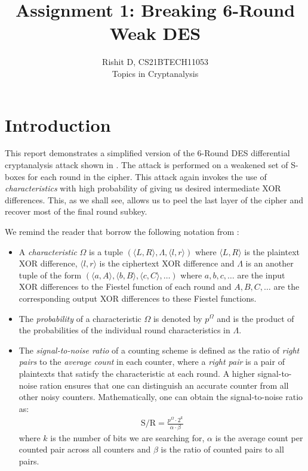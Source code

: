 \documentclass[12pt]{article}
\begin{document}
 
 
\title{Assignment 1: Breaking 6-Round Weak DES}
\author{Rishit D, CS21BTECH11053\\ %
Topics in Cryptanalysis} %


\maketitle

\section{Introduction}
This report demonstrates a simplified version of the 6-Round DES differential cryptanalysis attack shown in \cite{bsmv}. The attack is performed on a weakened set of S-boxes for each round in the cipher. This attack again invokes the use of \emph{characteristics} with high probability of giving us desired intermediate XOR differences. This, as we shall see, allows us to peel the last layer of the cipher and recover most of the final round subkey.

We remind the reader that borrow the following notation from \cite{bsmv}:
\begin{itemize}
  \item A \emph{characteristic} $\Omega$ is a tuple $(\langle L,R \rangle, \Lambda, \langle l,r \rangle)$ where $\langle L,R \rangle$ is the plaintext XOR difference, $\langle l,r \rangle$ is the ciphertext XOR difference and $\Lambda$ is an another tuple of the form $(\langle a,A \rangle, \langle b,B \rangle, \langle c,C \rangle, \dots)$ where $a,b,c,\dots$ are the input XOR differences to the Fiestel function of each round and $A,B,C,\dots$ are the corresponding output XOR differences to these Fiestel functions.

  \item The \emph{probability} of a characteristic $\Omega$ is denoted by $p^{\Omega}$ and is the product of the probabilities of the individual round characteristics in $\Lambda$.

  \item The \emph{signal-to-noise ratio} of a counting scheme is defined as the ratio of \emph{right pairs} to the \emph{average count} in each counter, where a \emph{right pair} is a pair of plaintexts that satisfy the characteristic at each round. A higher signal-to-noise ration ensures that one can distinguish an accurate counter from all other noisy counters. Mathematically, one can obtain the signal-to-noise ratio as:
    \begin{align*}
      \text{S/R} = \frac{p^{\Omega} \cdot 2^k}{\alpha \cdot \beta}
    \end{align*}
    where $k$ is the number of bits we are searching for, $\alpha$ is the average count per counted pair across all counters and $\beta$ is the ratio of counted pairs to all pairs.
\end{itemize}
\end{document}
